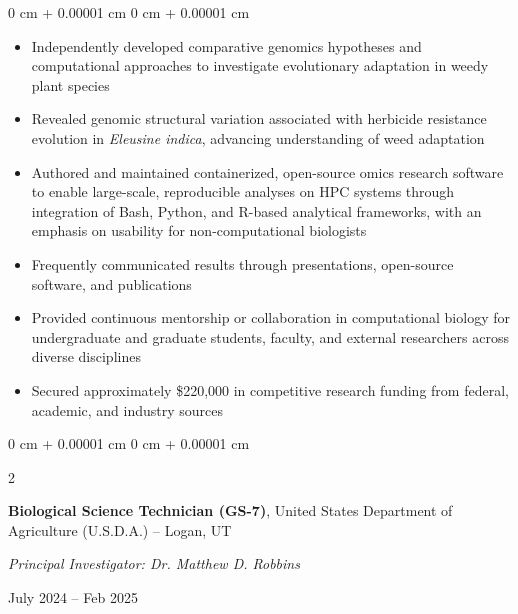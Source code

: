 \documentclass[10pt, letterpaper]{article}
\newenvironment{highlights}{
    \begin{itemize}[
        topsep=0.10 cm,
        parsep=0.10 cm,
        partopsep=0pt,
        itemsep=0pt,
        leftmargin=0 cm + 10pt
    ]
}{
    \end{itemize}
} %
\newenvironment{onecolentry}{
    \begin{adjustwidth}{
        0 cm + 0.00001 cm
    }{
        0 cm + 0.00001 cm
    }
}{
    \end{adjustwidth}
} %
\newenvironment{twocolentry}[2][]{
    \onecolentry
    \def\secondColumn{#2}
    \setcolumnwidth{\fill, 4.5 cm}
    \begin{paracol}{2}
}{
    \switchcolumn \raggedleft \secondColumn
    \end{paracol}
    \endonecolentry
} %
\begin{document}
        \begin{onecolentry}
            \begin{highlights}
                \item Independently developed comparative genomics hypotheses and computational approaches to investigate evolutionary adaptation in weedy plant species
                \item Revealed genomic structural variation associated with herbicide resistance evolution in \textit{Eleusine indica}, advancing understanding of weed adaptation
                \item Authored and maintained containerized, open-source omics research software to enable large-scale, reproducible analyses on HPC systems through integration of Bash, Python, and R-based analytical frameworks, with an emphasis on usability for non-computational biologists
                \item Frequently communicated results through presentations, open-source software, and publications 
                \item Provided continuous mentorship or collaboration in computational biology for undergraduate and graduate students, faculty, and external researchers across diverse disciplines
                \item Secured approximately \$220,000 in competitive research funding from federal, academic, and industry sources
                
            \end{highlights}
        \end{onecolentry}


        \vspace{0.2 cm}


        \begin{samepage}        
            \begin{twocolentry}{
                July 2024 – Feb 2025
                }
                \textbf{Biological Science Technician (GS-7)}, United States Department of Agriculture (U.S.D.A.) -- Logan, UT
                
                \vspace{0.05 cm}

                \textit{Principal Investigator: Dr. Matthew D. Robbins}
            \end{twocolentry}
        \end{samepage}
        
        \vspace{0.10 cm}
        
\end{document}
